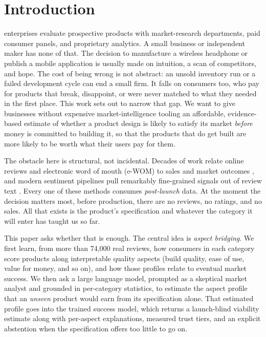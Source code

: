 \documentclass[journal]{IEEEtran}
\begin{document}
\section{Introduction}
 enterprises evaluate prospective products with market-research departments, paid consumer panels, and proprietary analytics. A small business or independent maker has none of that. The decision to manufacture a wireless headphone or publish a mobile application is usually made on intuition, a scan of competitors, and hope. The cost of being wrong is not abstract: an unsold inventory run or a failed development cycle can end a small firm. It falls on consumers too, who pay for products that break, disappoint, or were never matched to what they needed in the first place. This work sets out to narrow that gap. We want to give businesses without expensive market-intelligence tooling an affordable, evidence-based estimate of whether a product design is likely to satisfy its market \emph{before} money is committed to building it, so that the products that do get built are more likely to be worth what their users pay for them.

The obstacle here is structural, not incidental. Decades of work relate online reviews and electronic word of mouth (e-WOM) to sales and market outcomes \cite{chevalier2006wom,dellarocas2003digitization,chintagunta2010effects,luca2016reviews}, and modern sentiment pipelines pull remarkably fine-grained signals out of review text \cite{zhang2022survey,wang2025multifeature,shan2025bilingual}. Every one of these methods consumes \emph{post-launch} data. At the moment the decision matters most, before production, there are no reviews, no ratings, and no sales. All that exists is the product's specification and whatever the category it will enter has taught us so far.

This paper asks whether that is enough. The central idea is \emph{aspect bridging}. We first learn, from more than 74{,}000 real reviews, how consumers in each category score products along interpretable quality aspects (build quality, ease of use, value for money, and so on), and how those profiles relate to eventual market success. We then ask a large language model, prompted as a skeptical market analyst and grounded in per-category statistics, to estimate the aspect profile that an \emph{unseen} product would earn from its specification alone. That estimated profile goes into the trained success model, which returns a launch-blind viability estimate along with per-aspect explanations, measured trust tiers, and an explicit abstention when the specification offers too little to go on.
\end{document}
